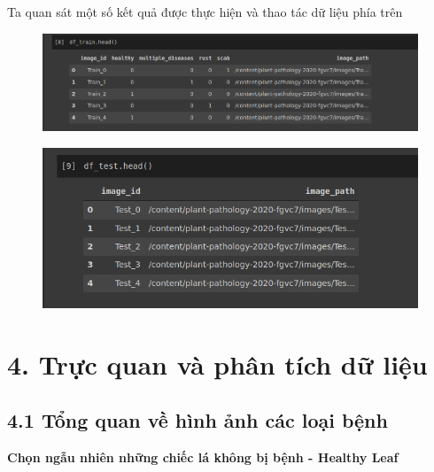 \documentclass{article}
\begin{document}
	Ta quan sát một số kết quả được thực hiện và thao tác dữ liệu phía trên
	\begin{figure}[H]
		\centering
		\includegraphics[width=0.75\linewidth]{images/head_df_train.png}
		\label{fig:writing-thesis}
	\end{figure}
	\begin{figure}[H]
		\centering
		\includegraphics[width=0.75\linewidth]{images/head_df_test.png}
		\label{fig:writing-thesis}
	\end{figure}
	
	\section{4. Trực quan và phân tích dữ liệu}
	\subsection{4.1 Tổng quan về hình ảnh các loại bệnh}
	\textbf{Chọn ngẫu nhiên những chiếc lá không bị bệnh - Healthy Leaf}
	
\end{document}

